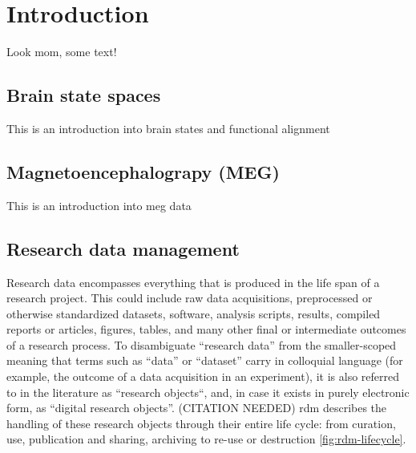 

\chapter{Introduction}
\label{chap:k1}

Look mom, some text!

\section{Brain state spaces}
This is an introduction into brain states and functional alignment
\pagebreak

\section{Magnetoencephalograpy (MEG)}
This is an introduction into \gls{meg} data
\pagebreak

\section{Research data management}

Research data encompasses everything that is produced in the life span of a research project.
This could include raw data acquisitions, preprocessed or otherwise standardized datasets, software, analysis scripts, results, compiled reports or articles, figures, tables, and many other final or intermediate outcomes of a research process.
To disambiguate ``research data'' from the smaller-scoped meaning that terms such as ``data'' or ``dataset'' carry in colloquial language (for example, the outcome of a data acquisition in an experiment), it is also referred to in the literature as ``research objects``, and, in case it exists in purely electronic form, as ``digital research objects''. (CITATION NEEDED)
\gls{rdm} describes the handling of these research objects through their entire life cycle: from curation, use, publication and sharing, archiving to re-use or destruction \ref{fig:rdm-lifecycle}.

